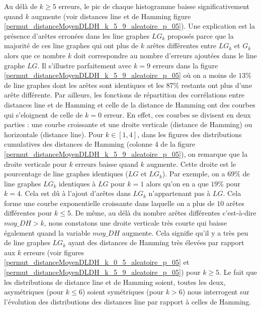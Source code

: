 \documentclass[onecolumn, 12pt]{book}
\begin{document}
Au d\'el\`a de $k \ge 5$ erreurs, le pic de chaque histogramme baisse significativement quand $k$ augmente (voir distances line et de  Hamming figure \ref{permut_distanceMoyenDLDH_k_5_9_aleatoire_p_05}). Une explication est la pr\'esence d'ar\^etes erron\'ees dans les line graphes $LG_k$ propos\'es parce que la majorit\'e de ces line graphes qui ont plus de $k$ ar\^etes diff\'erentes entre $LG_k$ et $G_k$ alors que ce nombre $k$ doit correspondre au nombre d'erreurs ajout\'ees dans le line graphe $LG$. Il s'illustre parfaitement avec $k = 9$ erreurs dans la figure \ref{permut_distanceMoyenDLDH_k_5_9_aleatoire_p_05} o\`u on a moins de $13\%$ de line graphes dont les ar\^etes sont identiques et les $87\%$ restants ont plus d'une  ar\^ete diff\'erente.
\newline
Par ailleurs, les fonctions de r\'epartition des corr\'elations entre distances line et de Hamming et celle de la distance de Hamming ont des courbes  qui s'eloignent de celle de $k = 0$ erreur. En effet, ces courbes se divisent en deux parties : une courbe croissante et une droite verticale (distance de Hamming) ou horizontale (distance line). 
Pour $k \in [1,4]$, dans les figures des distributions cumulatives des distances de Hamming (colonne 4 de la figure \ref{permut_distanceMoyenDLDH_k_5_9_aleatoire_p_05}), on remarque que la droite verticale pour $k$ erreurs baisse quand $k$ augmente. Cette droite est le pourcentage de line graphes identiques ($LG$ et $LG_k$). Par exemple, on a $69\%$ de line graphes $LG_k$ identiques \`a $LG$ pour $k = 1$ alors qu'on en a que $19\%$ pour $k=4$. Cela est d\^u \`a l'ajout d'ar\^etes dans $LG_k$ n'appartenant pas \`a $LG$. Cela  forme une courbe exponentielle croissante dans laquelle on a plus de $10$ ar\^etes diff\'erentes pour $k \le 5$.  \newline
De m\^eme, au d\'el\`a du nombre ar\^etes diff\'erentes c'est-\`a-dire $moy\_DH > k$, nous constatons une droite verticale tr\`es courte qui baisse \'egalement quand la variable $moy\_DH$ augmente. Cela signifie qu'il y a tr\`es peu de line graphes $LG_k$ ayant des  distances de Hamming tr\`es \'elev\'ees par rapport aux $k$ erreurs (voir figures \ref{permut_distanceMoyenDLDH_k_0_5_aleatoire_p_05} et \ref{permut_distanceMoyenDLDH_k_5_9_aleatoire_p_05})  pour $k \ge 5$.
\newline
Le fait que les distributions de distance line et de Hamming soient, toutes les deux, asym\'etriques (pour $k \le 6$) soient sym\'etriques (pour $k>6$) nous interrogent sur l'\'evolution des distributions des distances line par rapport \`a celles de Hamming. 
\end{document}
